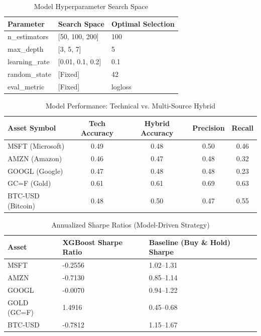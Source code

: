 \begin{table}[ht]
\centering
\caption{Model Hyperparameter Search Space}
\label{tab:hyperparameters}
\begin{tabular}{|l|l|l|}
\hline
\textbf{Parameter} & \textbf{Search Space} & \textbf{Optimal Selection} \\ \hline
n\_estimators & [50, 100, 200] & 100 \\ \hline
max\_depth & [3, 5, 7] & 5 \\ \hline
learning\_rate & [0.01, 0.1, 0.2] & 0.1 \\ \hline
random\_state & [Fixed] & 42 \\ \hline
eval\_metric & [Fixed] & logloss \\ \hline
\end{tabular}
\end{table}

\begin{table}[ht]
\centering
\caption{Model Performance: Technical vs. Multi-Source Hybrid}
\label{tab:model_comparison}
\begin{tabular}{|l|c|c|c|c|}
\hline
\textbf{Asset Symbol} & \textbf{Tech Accuracy} & \textbf{Hybrid Accuracy} & \textbf{Precision} & \textbf{Recall} \\ \hline
MSFT (Microsoft) & 0.49 & 0.48 & 0.50 & 0.46 \\ \hline
AMZN (Amazon) & 0.46 & 0.47 & 0.48 & 0.32 \\ \hline
GOOGL (Google) & 0.47 & 0.48 & 0.48 & 0.23 \\ \hline
GC=F (Gold) & 0.61 & 0.61 & 0.69 & 0.63 \\ \hline
BTC-USD (Bitcoin) & 0.48 & 0.50 & 0.47 & 0.55 \\ \hline
\end{tabular}
\end{table}

\begin{table}[ht]
\centering
\caption{Annualized Sharpe Ratios (Model-Driven Strategy)}
\label{tab:sharpe_ratios}
\begin{tabular}{|l|l|l|}
\hline
\textbf{Asset} & \textbf{XGBoost Sharpe Ratio} & \textbf{Baseline (Buy \& Hold) Sharpe} \\ \hline
MSFT & -0.2556 & 1.02--1.31 \\ \hline
AMZN & -0.7130 & 0.85--1.14 \\ \hline
GOOGL & -0.0070 & 0.94--1.22 \\ \hline
GOLD (GC=F) & 1.4916 & 0.45--0.68 \\ \hline
BTC-USD & -0.7812 & 1.15--1.67 \\ \hline
\end{tabular}
\end{table}

